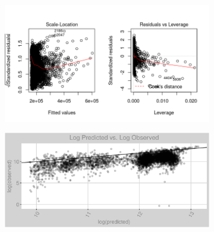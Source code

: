 \begin{figure}[h]
\centering
\begin{subfigure}{1\textwidth}
\centering
\includegraphics[width=.99\textwidth, height=0.425\textheight]{Images/electricity_psf_rf_res_2.png}
\end{subfigure}
\begin{subfigure}{1\textwidth}
\centering
\includegraphics[width=.99\textwidth, height=0.475\textheight]{Images/electricity_psf_rf_pvo.png}
\end{subfigure}
\end{figure}
\FloatBarrier
\newpage
